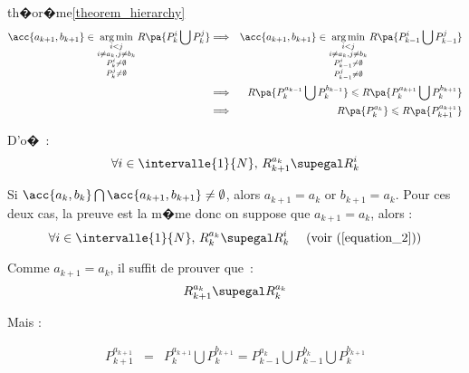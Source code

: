\begin{xdemo}{th�or�me}{\ref{theorem_hierarchy}}
    \begin{eqnarray*}
    \acc{a_{k+1},b_{k+1}} \in \underset{  \begin{subarray}{c} i < j \\ i \neq a_k, j\neq b_k\\
        P_{k}^i \neq \emptyset \\ P_{k}^j \neq \emptyset\end{subarray} }
        {\arg \min} \, R\pa{P_{k}^i \bigcup P_{k}^j}   
    &\Longrightarrow& \acc{a_{k+1},b_{k+1}} \in \underset{  \begin{subarray}{c} i < j \\ i \neq a_k, j\neq b_k\\
        P_{k-1}^i \neq \emptyset \\ P_{k-1}^j \neq \emptyset\end{subarray} }
        {\arg \min} \, R\pa{P_{k-1}^i \bigcup P_{k-1}^j}\\
    &\Longrightarrow& R\pa{P_k^{a_{k-1}} \bigcup P_k^{b_{k-1}}}   \leqslant R\pa{P_k^{a_{k+1}} \bigcup P_k^{b_{k+1}}} \\
    &\Longrightarrow& R\pa{ P_k^{a_{k}} }   \leqslant R\pa{ P_{k+1}^{a_{k+1}} }
    \end{eqnarray*}

D'o�~:
    \begin{eqnarray}
    \forall i \in \intervalle{1}{N}, \, R_{k+1}^{a_k} \supegal R_{k}^{i} \label{equation_reca_1}
    \end{eqnarray}




\itemdemo
\quad 
{} 

Si $\acc{a_k,b_k} \bigcap \acc{a_{k+1},b_{k+1}} \neq \emptyset$, alors $a_{k+1} = a_k$ or $b_{k+1} = a_k$. Pour ces deux cas, la preuve est la m�me donc on suppose que $a_{k+1} = a_k$, alors :
    $$
    \forall i \in \intervalle{1}{N}, \, R_k^{a_k} \supegal R_{k}^{i} \quad \text{ (voir (\ref{equation_2}))}
    $$

Comme $a_{k+1} = a_k$, il suffit de prouver que~:
    $$
    R_{k+1}^{a_{k}} \supegal R_{k}^{a_{k}}
    $$

Mais :

    \begin{eqnarray*}
    P_{k+1}^{a_{k+1}}   &=&     P_{k}^{a_{k+1}} \bigcup P_{k}^{b_{k+1}}
                        =     P_{k-1}^{a_{k}} \bigcup P_{k-1}^{b_{k}} \bigcup P_{k}^{b_{k+1}}
    \end{eqnarray*}


\end{xdemo}
